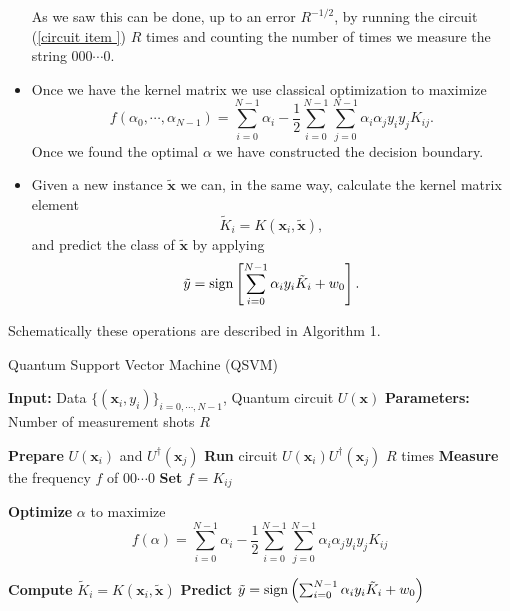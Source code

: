 \documentclass[12pt]{article}
\begin{document}
\begin{itemize}
\begin{equation}
    \end{equation}
    As we saw this can be done, up to an error $R^{-1/2}$, by running the circuit (\ref{circuit item }) $R$ times and counting the number of times we measure the string $000\cdots 0$.
    \item Once we have the kernel matrix we use classical optimization to maximize
    \begin{equation}
        f(\alpha_0,\cdots,\alpha_{N-1})=\sum_{i=0}^{N-1} \alpha_i-\frac{1}{2}\sum_{i=0}^{N-1}\sum_{j=0}^{N-1}\alpha_i\alpha_jy_iy_jK_{ij}.
        \label{loss function}
    \end{equation}
    Once we found the optimal $\alpha$ we have constructed the decision boundary.
    \item Given a new instance $\tilde{\mathbf{x}}$ we can, in the same way, calculate the kernel matrix element $$\tilde{K}_i=K(\mathbf{x}_i, \tilde{\mathbf{x}}),$$ and predict the class of $\tilde{\mathbf{x}}$ by applying \begin{equation}
        \tilde{y}=\textup{sign}\left[\sum_{i=0}^{N-1}\alpha_iy_i\tilde{K}_i+w_0\right].
    \end{equation}
\end{itemize}

Schematically these operations are described in Algorithm 1. 

\begin{algorithm}[H]
    \caption{Quantum Support Vector Machine (QSVM)}
    \begin{algorithmic}[1]
        \State \textbf{Input:} Data $\{(\mathbf{x}_i, y_i)\}_{i=0,\cdots,N-1}$, Quantum circuit $U(\mathbf{x})$
        \State \textbf{Parameters:} Number of measurement shots $R$
        
                \State \textbf{Prepare} $U(\mathbf{x}_i)$ and $U^\dagger(\mathbf{x}_j)$
                \State \textbf{Run} circuit $U(\mathbf{x}_i)U^\dagger(\mathbf{x}_j)$ $R$ times  
                \State \textbf{Measure} the frequency $f$ of $00\cdots 0$ 
                \State \textbf{Set} $f=K_{ij}$ 
            \EndFor
        \EndFor
        
        \State \textbf{Optimize} $\alpha$ to maximize
        \begin{equation*}
            f(\alpha) = \sum_{i=0}^{N-1} \alpha_i - \frac{1}{2} \sum_{i=0}^{N-1} \sum_{j=0}^{N-1} \alpha_i \alpha_j y_i y_j K_{ij}
        \end{equation*}
    
            \State \textbf{Compute} $\tilde{K}_i = K(\mathbf{x}_i, \tilde{\mathbf{x}})$
            \State \textbf{Predict} $\tilde{y} = \textup{sign}\left(\sum_{i=0}^{N-1} \alpha_i y_i \tilde{K}_i + w_0\right)$
        \EndFor
        
    \end{algorithmic}
    \end{algorithm}
\end{document}
